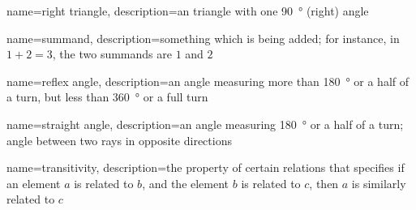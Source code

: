 {
  name=right triangle,
  description={an triangle with one \SI{90}{\degree} (right) angle}
}

{
  name=summand,
  description={something which is being added; for instance, in $1+2=3$,
  the two summands are $1$ and $2$}
}

{
  name=reflex angle,
  description={an angle measuring more than \SI{180}{\degree} or a half of a
  turn, but less than \SI{360}{\degree} or a full turn}
}

{
  name=straight angle,
  description={an angle measuring \SI{180}{\degree} or a half of a turn; angle
  between two rays in opposite directions}
}

{
  name=transitivity,
  description={the property of certain relations that specifies if an
  element $a$ is related to $b$, and the element $b$ is related to $c$,
  then $a$ is similarly related to $c$}
}

